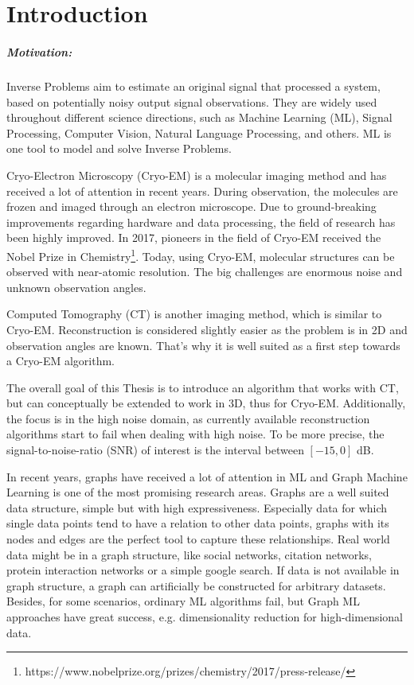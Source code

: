 \chapter{Introduction}
\label{sec:introduction}

\paragraph{Motivation:}
Inverse Problems aim to estimate an original signal that processed a system, 
based on potentially noisy output signal observations.
They are widely used throughout different science directions, such as Machine Learning (ML),
Signal Processing, Computer Vision, Natural Language Processing, and others.
ML is one tool to model and solve Inverse Problems.

Cryo-Electron Microscopy (Cryo-EM) is a molecular imaging method and has received a lot of attention in recent years. 
During observation, the molecules are frozen and imaged through an electron microscope.
Due to ground-breaking improvements regarding hardware and data processing, the field of research
has been highly improved. In 2017, pioneers in the field of Cryo-EM received the 
Nobel Prize in Chemistry\footnote{https://www.nobelprize.org/prizes/chemistry/2017/press-release/}.
Today, using Cryo-EM, molecular structures can be observed with near-atomic resolution.
The big challenges are enormous noise and unknown observation angles.

Computed Tomography (CT) is another imaging method, which is similar to Cryo-EM. 
Reconstruction is considered slightly easier as the problem is in 2D and observation angles are known.
That's why it is well suited as a first step towards a Cryo-EM algorithm.

The overall goal of this Thesis is to introduce an algorithm that works with CT, but 
can conceptually be extended to work in 3D, thus for Cryo-EM. 
Additionally, the focus is in the high noise domain, as currently available reconstruction algorithms
start to fail when dealing with high noise. To be more precise, the signal-to-noise-ratio (SNR) of interest is the interval 
 between $[-15, 0]$ dB.


In recent years, graphs have received a lot of attention in ML and Graph Machine Learning is one of the most promising research areas\cite{GNN,GCN, GAT,simpleGCN,simpleGCN}.
Graphs are a well suited data structure, simple but with high expressiveness. 
Especially data for which single data points tend to have a relation to other data points, graphs with its nodes and edges are the perfect tool
to capture these relationships. 
Real world data might be in a graph structure, like social networks, citation networks,
protein interaction networks or a simple google search. 
If data is not available in graph structure, a graph can artificially be constructed for arbitrary datasets.
Besides, for some scenarios, ordinary ML algorithms fail, but Graph ML approaches have great success, e.g. dimensionality reduction for high-dimensional data.



